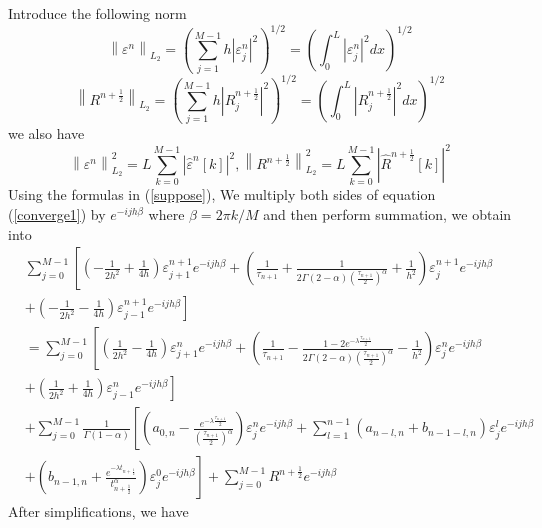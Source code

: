 \documentclass[10pt, reqno]{amsart}
\theoremstyle{remark}
\theoremstyle{definition}
\numberwithin{table}{section}
\begin{document}
Introduce the following norm
$$
\left\|\varepsilon^n\right\|_{L_2}=\left(\sum_{j=1}^{M-1} h\left|\varepsilon_j^n\right|^2\right)^{1 / 2}=\left(\int_0^L\left|\varepsilon_j^n\right|^2 d x\right)^{1 / 2}
$$
$$
\left\|R^{n+\frac{1}{2}}\right\|_{L_2}=\left(\sum_{j=1}^{M-1} h\left|R^{n+\frac{1}{2}}_j\right|^2\right)^{1 / 2}=\left(\int_0^L\left|R^{n+\frac{1}{2}}_j\right|^2 d x\right)^{1 / 2}
$$
we also have
$$
\left\|\varepsilon^n\right\|_{L_2}^2=L\sum_{k=0}^{M-1}\left|\hat{\varepsilon}^n[k]\right|^2, \left\|R^{n+\frac{1}{2}}\right\|_{L_2}^2=L\sum_{k=0}^{M-1}\left|\hat{R}^{n+\frac{1}{2}}[k]\right|^2
$$
  Using the formulas in (\ref{suppose}),  We multiply both sides of equation  (\ref{converge1}) by $e^{-ijh\beta}$  where $\beta = 2\pi k/M$ and then perform summation, we obtain into
\begin{equation}
\begin{aligned}
&\sum_{j=0}^{M-1}\left[\left(-\frac{1}{2 h^2}+\frac{1}{4h}\right) \varepsilon_{j+1}^{n+1}e^{-ijh\beta}+\left(\frac{1}{\tau_{n+1}}+\frac{1}{2\Gamma(2-\alpha)(\frac{\tau_{n+1}}{2})^\alpha}+\frac{1}{h^2}\right) \varepsilon_{j}^{n+1}e^{-ijh\beta}\right. \\
&\left. +\left(-\frac{1}{2 h^2}-\frac{1}{4h}\right) \varepsilon_{j-1}^{n+1}e^{-ijh\beta}\right] \\
&=\sum_{j=0}^{M-1}\left[\left(\frac{1}{2 h^2}-\frac{1}{4h}\right) \varepsilon_{j+1}^{n}e^{-ijh\beta}+\left(\frac{1}{\tau_{n+1}}-\frac{1-2e^{-\lambda \frac{\tau_{n+1}}{2}}}{2\Gamma(2-\alpha)(\frac{\tau_{n+1}}{2})^\alpha}-\frac{1}{h^2}\right) \varepsilon_{j}^{n}e^{-ijh\beta}\right. \\
&\left. +\left(\frac{1}{2 h^2}+\frac{1}{4h}\right) \varepsilon_{j-1}^{n}e^{-ijh\beta}\right] \\
&+\sum_{j=0}^{M-1}\frac{1}{\Gamma(1-\alpha)}\left[(a_{0, n}-\frac{e^{-\lambda \frac{\tau_{n+1}}{2}}}{(\frac{\tau_{n+1}}{2})^\alpha}) \varepsilon_{j}^{n}e^{-ijh\beta}+\sum\limits_{l=1}^{n-1} \left(a_{n-l, n}+b_{n-1-l, n}\right) \varepsilon_{j}^{l}e^{-ijh\beta}\right. \\
&\left. +(b_{n-1, n}+\frac{e^{-\lambda t_{n+\frac{1}{2}}}}{t_{n+\frac{1}{2}}^\alpha}) \varepsilon_{j}^{0}e^{-ijh\beta}\right] +\sum_{j=0}^{M-1}R^{n+\frac{1}{2}} e^{-i j h \beta}
\end{aligned}
\end{equation}
After simplifications,  we have
\end{document}
